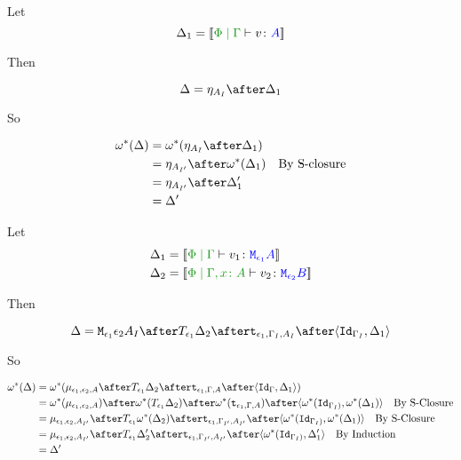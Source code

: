 {
Let \begin{equation}
    \D_1 = \deno{\gpetyperelation{v}{A}}
\end{equation}

Then

\begin{equation}
    \D = \point{A_I}\after \D_1\\
\end{equation}

So

\begin{align}
    \w\star(\D) &= \w\star(\point{A_I}\after \D_1)\\
            & = \point{A_{I'}} \after\w\star(\D_1)\qt{By S-closure}\\
            & = \point{A_{I'}} \after\D_1'\\
            & = \D'
\end{align}

Let \begin{align}
    \D_1 &= \deno{\gpetyperelation{v_1}{\M{\e_1}{A}}}\\
    \D_2 &= \deno{\etyperelation{\P}{\gax}{v_2}{\M{\e_2}{B}}}
\end{align}

Then

\begin{equation}
    \D = \M{\e_1}{\e_2}{A_I}\after\T{\e_1}{\D_2}\after\tstrength{\e_1}{\G_I}{A_I}\after\pr{\Id{\G_{I}}}{\D_1}\\
\end{equation}

So

\begin{align}
    \w\star(\D) &= \w\star(\bind{\e_1}{\e_2}{A}\after\T{\e_1}{\D_2}\after\tstrength{\e_1}{\G}{A}\after\pr{\Id{\G}}{\D_1})\\
    & = \w\star(\bind{\e_1}{\e_2}{A})\after\w\star(\T{\e_1}{\D_2})\after\w\star(\tstrength{\e_1}{\G}{A})\after\pr{\w\star(\Id{\G_{I})}}{\w\star(\D_1)}\qt{By S-Closure}\\
    &= \bind{\e_1}{\e_2}{A_{I'}}\after\T{\e_1}{\w\star(\D_2)}\after\tstrength{\e_1}{\G_{I'}}{A_{I'}}\after\pr{\w\star(\Id{\G_{I})}}{\w\star(\D_1)}\qt{By S-Closure}\\
    &= \bind{\e_1}{\e_2}{A_{I'}}\after\T{\e_1}{\D_2'}\after\tstrength{\e_1}{\G_{I'}}{A_{I'}}\after\pr{\w\star(\Id{\G_{I})}}{\D_1'}\qt{By Induction}\\
    &= \D'\\
\end{align}

}
